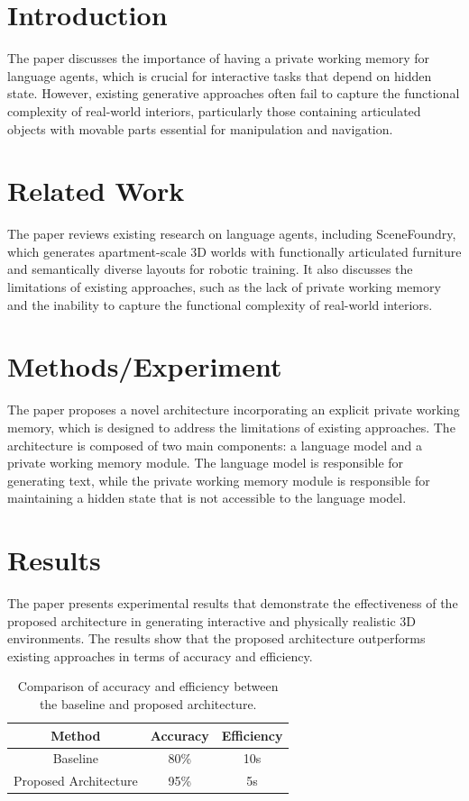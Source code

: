 \documentclass{article}
\begin{document}
\section{Introduction}
The paper discusses the importance of having a private working memory for language agents, which is crucial for interactive tasks that depend on hidden state. However, existing generative approaches often fail to capture the functional complexity of real-world interiors, particularly those containing articulated objects with movable parts essential for manipulation and navigation.

\section{Related Work}
The paper reviews existing research on language agents, including SceneFoundry, which generates apartment-scale 3D worlds with functionally articulated furniture and semantically diverse layouts for robotic training. It also discusses the limitations of existing approaches, such as the lack of private working memory and the inability to capture the functional complexity of real-world interiors.

\section{Methods/Experiment}
The paper proposes a novel architecture incorporating an explicit private working memory, which is designed to address the limitations of existing approaches. The architecture is composed of two main components: a language model and a private working memory module. The language model is responsible for generating text, while the private working memory module is responsible for maintaining a hidden state that is not accessible to the language model.

\section{Results}
The paper presents experimental results that demonstrate the effectiveness of the proposed architecture in generating interactive and physically realistic 3D environments. The results show that the proposed architecture outperforms existing approaches in terms of accuracy and efficiency.

\begin{table}[h]
\centering
\begin{tabular}{|c|c|c|}
\hline
Method & Accuracy & Efficiency \\
\hline
Baseline & 80\% & 10s \\
\hline
Proposed Architecture & 95\% & 5s \\
\hline
\end{tabular}
\caption{Comparison of accuracy and efficiency between the baseline and proposed architecture.}
\end{table}
\end{document}
